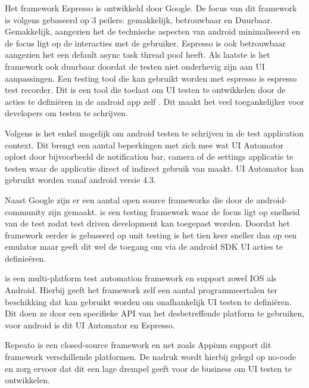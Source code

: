 Het framework Espresso is ontwikkeld door Google. De focus van dit framework is volgens \textcite{Zakharov2013} gebaseerd op 3 peilers:
gemakkelijk, betrouwbaar en Duurbaar. Gemakkelijk, aangezien het de technische aspecten van android minimaliseerd en de focus ligt op de interacties met de gebruiker. Espresso is ook betrouwbaar aangezien het een default async task thread pool heeft. Als laatste is het framework ook duurbaar doordat de testen niet onderhevig zijn aan UI aanpassingen.
Een testing tool die kan gebruikt worden met espresso is espresso test recorder. Dit is een tool die toelaat om UI testen te ontwikkelen door de acties te definiëren in de android app zelf \textcite{Google2022a}. Dit maakt het veel toegankelijker voor developers om testen te schrijven.

Volgens \textcite{Zelenchuk} is het enkel mogelijk om android testen te schrijven in de test application context. Dit brengt een aantal beperkingen met zich mee wat UI Automator oplost door bijvoorbeeld de notification bar, camera of de settings applicatie te testen waar de applicatie direct of indirect gebruik van maakt. UI Automator kan gebruikt worden vanaf android versie 4.3.

Naast Google zijn er een aantal open source frameworks die door de android-community zijn gemaakt. \textcite{Roboelectric2022} is een testing framework waar de focus ligt op snelheid van de test zodat test driven development kan toegepast worden. Doordat het framework eerder is gebaseerd op unit testing is het tien keer sneller dan op een emulator maar geeft dit wel de toegang om via de android SDK UI acties te definieëren.

\textcite{key1} is een multi-platform test automation framework en support zowel IOS als Android. Hierbij geeft het framework zelf een aantal programmeertalen ter beschikking dat kan gebruikt worden om onafhankelijk UI testen te definiëren. Dit doen ze door een specifieke API van het desbetreffende platform te gebruiken, voor android is dit UI Automator en Espresso.

Repeato is een closed-source framework en net zoals Appium support dit framework verschillende platformen. De nadruk wordt hierbij gelegd op no-code en zorg ervoor dat dit een lage drempel geeft voor de business om UI testen te ontwikkelen.

